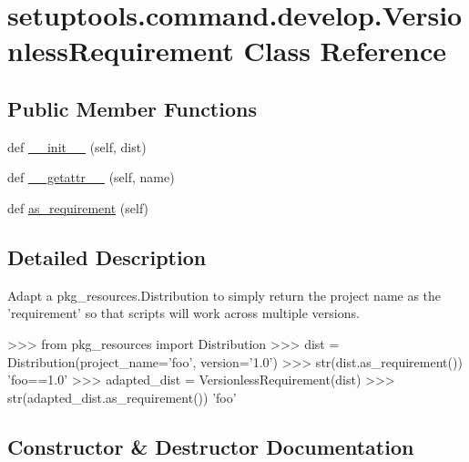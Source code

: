 \hypertarget{classsetuptools_1_1command_1_1develop_1_1VersionlessRequirement}{}\section{setuptools.\+command.\+develop.\+Versionless\+Requirement Class Reference}
\label{classsetuptools_1_1command_1_1develop_1_1VersionlessRequirement}
\subsection*{Public Member Functions}
\begin{DoxyCompactItemize}
\item 
def \hyperlink{classsetuptools_1_1command_1_1develop_1_1VersionlessRequirement_af061e705b06e1d98f3c129ea74805851}{\+\_\+\+\_\+init\+\_\+\+\_\+} (self, dist)
\item 
def \hyperlink{classsetuptools_1_1command_1_1develop_1_1VersionlessRequirement_a467f595f6bbaa8497ffd43176513b68b}{\+\_\+\+\_\+getattr\+\_\+\+\_\+} (self, name)
\item 
def \hyperlink{classsetuptools_1_1command_1_1develop_1_1VersionlessRequirement_ab9bc06f36f92fb67455cc2bf0e53ccb3}{as\+\_\+requirement} (self)
\end{DoxyCompactItemize}


\subsection{Detailed Description}
\begin{DoxyVerb}Adapt a pkg_resources.Distribution to simply return the project
name as the 'requirement' so that scripts will work across
multiple versions.

>>> from pkg_resources import Distribution
>>> dist = Distribution(project_name='foo', version='1.0')
>>> str(dist.as_requirement())
'foo==1.0'
>>> adapted_dist = VersionlessRequirement(dist)
>>> str(adapted_dist.as_requirement())
'foo'
\end{DoxyVerb}
 

\subsection{Constructor \& Destructor Documentation}
\mbox{\label{classsetuptools_1_1command_1_1develop_1_1VersionlessRequirement_af061e705b06e1d98f3c129ea74805851}} 
